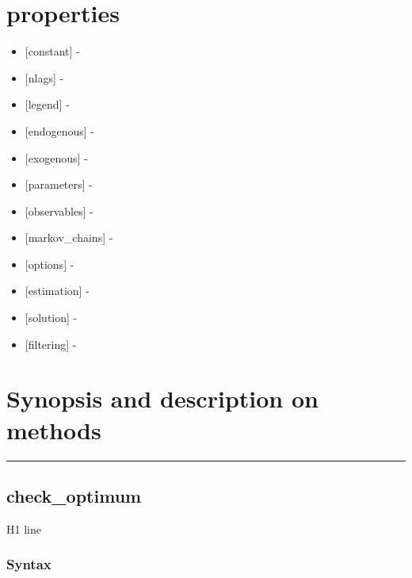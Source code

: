 \documentclass[letterpaper,10pt,english]{sphinxmanual}
\begin{document}
\section{properties}
\label{classes/models/@svar/svar:properties}\begin{itemize}
\item {} 
{[}constant{]} -

\item {} 
{[}nlags{]} -

\item {} 
{[}legend{]} -

\item {} 
{[}endogenous{]} -

\item {} 
{[}exogenous{]} -

\item {} 
{[}parameters{]} -

\item {} 
{[}observables{]} -

\item {} 
{[}markov\_chains{]} -

\item {} 
{[}options{]} -

\item {} 
{[}estimation{]} -

\item {} 
{[}solution{]} -

\item {} 
{[}filtering{]} -

\end{itemize}


\section{Synopsis and description on methods}
\label{classes/models/@svar/svar:synopsis-and-description-on-methods}

\bigskip\hrule{}\bigskip



\subsection{check\_optimum}
\label{classes/models/@svar/svar:check-optimum}\label{classes/models/@svar/svar:id1}
H1 line


\subsubsection{Syntax}
\label{classes/models/@svar/svar:syntax}
\end{document}
